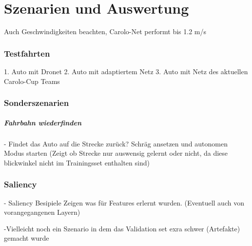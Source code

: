 %
\chapter{Szenarien und Auswertung}

Auch Geschwindigkeiten beachten, Carolo-Net performt bis 1.2 m/s
\subsection{Testfahrten}

1. Auto mit Dronet 
2. Auto mit adaptiertem Netz
3. Auto mit Netz des aktuellen Carolo-Cup Teams 

\subsection{Sonderszenarien}


\paragraph{Fahrbahn wiederfinden}




- Findet das Auto auf die Strecke zurück? Schräg ansetzen und autonomen Modus starten
(Zeigt ob Strecke nur auswensig gelernt oder nicht, da  diese blickwinkel nicht im Trainingsset enthalten sind)

\subsection{Saliency}
- Saliency Besipiele Zeigen was für Features erlernt wurden. (Eventuell auch von vorangegangenen Layern)

-Vielleicht noch ein Szenario in dem das Validation set exra schwer (Artefakte) gemacht wurde